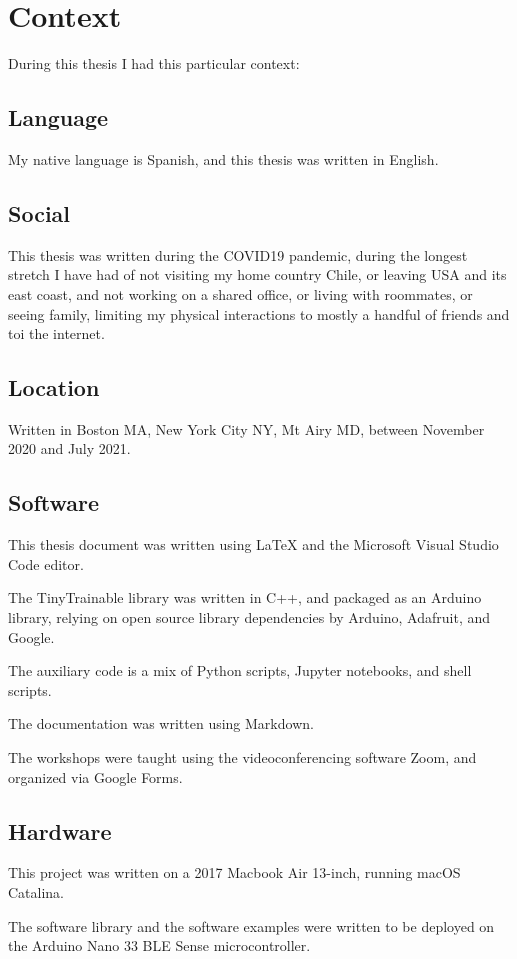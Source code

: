 \chapter{Context}

During this thesis I had this particular context:

\section{Language}

My native language is Spanish, and this thesis was written in English.

\section{Social}

This thesis was written during the COVID19 pandemic, during the longest stretch I have had of not visiting my home country Chile, or leaving USA and its east coast, and not working on a shared office, or living with roommates, or seeing family, limiting my physical interactions to mostly a handful of friends and toi the internet.

\section{Location}

Written in Boston MA, New York City NY, Mt Airy MD, between November 2020 and July 2021.

\section{Software}

This thesis document was written using LaTeX and the Microsoft Visual Studio Code editor.

The TinyTrainable library was written in C++, and packaged as an Arduino library, relying on open source library dependencies by Arduino, Adafruit, and Google.

The auxiliary code is a mix of Python scripts, Jupyter notebooks, and shell scripts.

The documentation was written using Markdown.

The workshops were taught using the videoconferencing software Zoom, and organized via Google Forms.

\section{Hardware}

This project was written on a 2017 Macbook Air 13-inch, running macOS Catalina.

The software library and the software examples were written to be deployed on the Arduino Nano 33 BLE Sense microcontroller.

\newpage
